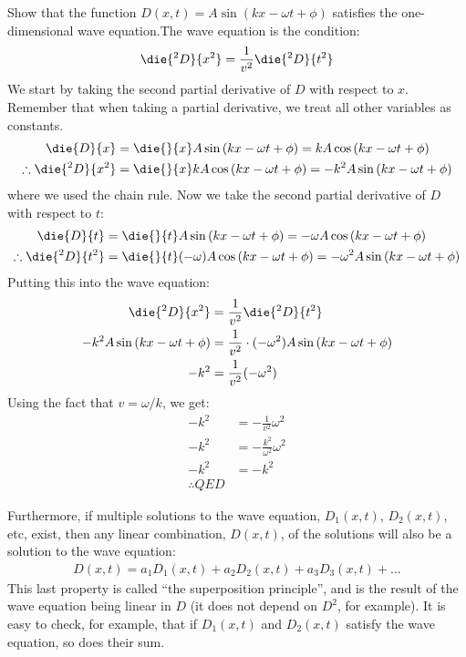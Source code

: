 \begin{example}{Show that the function $D(x,t) = A\sin\left( kx -\omega t + \phi \right)$ satisfies the one-dimensional wave equation.}The wave equation is the condition:
\begin{align*}
\die{^2D}{x^2}=\frac{1}{v^2}\die{^2D}{t^2}
\end{align*}
We start by taking the second partial derivative of $D$ with respect to $x$. Remember that when taking a partial derivative, we treat all other variables as constants. 
\begin{align*}
\die{D}{x}&=\die{}{x}A\sin\left( kx -\omega t + \phi \right)=kA\cos\left( kx -\omega t + \phi \right)\\
\therefore \die{^2D}{x^2}&=\die{}{x}kA\cos\left( kx -\omega t + \phi \right)=-k^2A\sin\left( kx -\omega t + \phi \right)
\end{align*}
where we used the chain rule. Now we take the second partial derivative of $D$ with respect to $t$:
\begin{align*}
\die{D}{t}&=\die{}{t}A\sin\left( kx -\omega t + \phi \right)=-\omega A\cos\left( kx -\omega t + \phi \right)\\
\therefore \die{^2D}{t^2}&=\die{}{t}(-\omega)A\cos\left( kx -\omega t + \phi \right)=-\omega^2A\sin\left( kx -\omega t + \phi \right)
\end{align*}
Putting this into the wave equation:
\begin{align*}
\die{^2D}{x^2}&=\frac{1}{v^2}\die{^2D}{t^2}\\
-k^2A\sin\left( kx -\omega t + \phi \right)&=\frac{1}{v^2}\cdot (-\omega^2)A\sin\left( kx -\omega t + \phi \right)\\
-k^2&=\frac{1}{v^2}(-\omega^2)\\
\end{align*}
Using the fact that $v=\omega/k$, we get:
\begin{align*}
-k^2&=-\frac{1}{v^2}\omega^2\\
-k^2&=-\frac{k^2}{\omega^2}\omega^2\\
-k^2&=-k^2\\
\therefore QED
\end{align*}
\end{example}

Furthermore, if multiple solutions to the wave equation, $D_1(x,t)$, $D_2(x,t)$, etc, exist, then any linear combination, $D(x,t)$, of the solutions will also be a solution to the wave equation:
\begin{align*}
D(x,t) = a_1D_1(x,t)+a_2D_2(x,t)+a_3D_3(x,t)+\dots
\end{align*}
This last property is called ``the superposition principle'', and is the result of the wave equation being linear in $D$ (it does not depend on $D^2$, for example). It is easy to check, for example, that if $D_1(x,t)$ and $D_2(x,t)$ satisfy the wave equation, so does their sum. 

